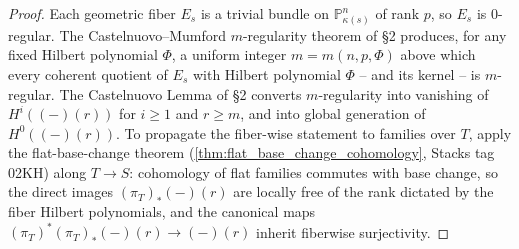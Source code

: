 \begin{proof}

  Each geometric fiber \(E_s\) is a trivial bundle on \(\mathbb{P}^n_{\kappa(s)}\)
  of rank \(p\), so \(E_s\) is \(0\)-regular. The Castelnuovo--Mumford
  \(m\)-regularity theorem of \cite{nitsure-hilbert-quot} \S 2 produces, for any fixed Hilbert
  polynomial \(\Phi\), a uniform integer \(m = m(n, p, \Phi)\) above which
  every coherent quotient of \(E_s\) with Hilbert polynomial \(\Phi\) -- and
  its kernel -- is \(m\)-regular. The Castelnuovo Lemma of \cite{nitsure-hilbert-quot} \S 2
  converts \(m\)-regularity into vanishing of \(H^i((-) (r))\) for \(i \ge 1\)
  and \(r \ge m\), and into global generation of \(H^0((-)(r))\). To
  propagate the fiber-wise statement to families over \(T\), apply the
  flat-base-change theorem (\cref{thm:flat_base_change_cohomology}, Stacks
  tag 02KH) along \(T \to S\): cohomology of flat families commutes with
  base change, so the direct images \((\pi_T)_*(-)(r)\) are locally free of
  the rank dictated by the fiber Hilbert polynomials, and the canonical
  maps \((\pi_T)^* (\pi_T)_*(-)(r) \to (-)(r)\) inherit fiberwise
  surjectivity.
\end{proof}

